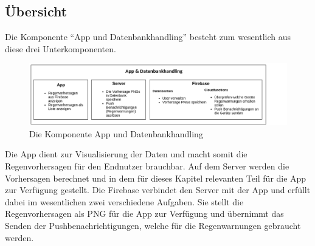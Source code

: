 \subsection{Übersicht}\label{übersicht}
Die Komponente “App und Datenbankhandling” besteht zum wesentlich aus diese drei Unterkomponenten.  

\begin{figure}[h]
 \centering
 \includegraphics[width=1\textwidth,angle=0]{abb/app_datenbank_komponente_uebersicht}
 \caption[Komponentenübersicht App und Datenbankhandling]{Die Komponente App und Datenbankhandling}
\label{fig:Beschreibung}
\end{figure}

Die App dient zur Visualisierung der Daten und macht somit die Regenvorhersagen für den Endnutzer brauchbar. 
Auf dem Server werden die Vorhersagen berechnet und in dem für dieses Kapitel relevanten Teil
für die App zur Verfügung gestellt. 
Die Firebase verbindet den Server mit der App und erfüllt dabei im wesentlichen zwei verschiedene Aufgaben. 
Sie stellt die Regenvorhersagen als PNG für die App zur Verfügung und übernimmt das  Senden der Pushbenachrichtigungen,
welche für die Regenwarnungen gebraucht werden.
 

